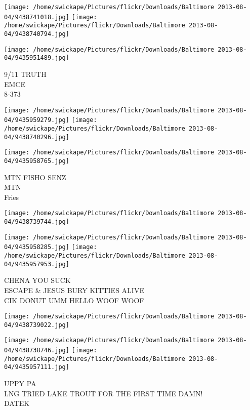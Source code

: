 \documentclass[10pt,letterpaper]{article}
\begin{document}
\texttt{[image: /home/swickape/Pictures/flickr/Downloads/Baltimore 2013-08-04/9438741018.jpg]}
\texttt{[image: /home/swickape/Pictures/flickr/Downloads/Baltimore 2013-08-04/9438740794.jpg]}

\vspace{0.25in}
\texttt{[image: /home/swickape/Pictures/flickr/Downloads/Baltimore 2013-08-04/9435951489.jpg]}

9/11 TRUTH\\
EMCE\\
8{-}373\\
\pagebreak

\texttt{[image: /home/swickape/Pictures/flickr/Downloads/Baltimore 2013-08-04/9435959279.jpg]}
\texttt{[image: /home/swickape/Pictures/flickr/Downloads/Baltimore 2013-08-04/9438740296.jpg]}

\vspace{0.25in}
\texttt{[image: /home/swickape/Pictures/flickr/Downloads/Baltimore 2013-08-04/9435958765.jpg]}

MTN FISHO SENZ\\
MTN\\
Fries\\
\pagebreak

\texttt{[image: /home/swickape/Pictures/flickr/Downloads/Baltimore 2013-08-04/9438739744.jpg]}

\vspace{0.25in}
\texttt{[image: /home/swickape/Pictures/flickr/Downloads/Baltimore 2013-08-04/9435958285.jpg]}
\texttt{[image: /home/swickape/Pictures/flickr/Downloads/Baltimore 2013-08-04/9435957953.jpg]}

CHENA YOU SUCK\\
ESCAPE \& JESUS BURY KITTIES ALIVE\\
CIK DONUT UMM HELLO WOOF WOOF\\
\pagebreak

\texttt{[image: /home/swickape/Pictures/flickr/Downloads/Baltimore 2013-08-04/9438739022.jpg]}

\vspace{0.25in}
\texttt{[image: /home/swickape/Pictures/flickr/Downloads/Baltimore 2013-08-04/9438738746.jpg]}
\texttt{[image: /home/swickape/Pictures/flickr/Downloads/Baltimore 2013-08-04/9435957111.jpg]}

UPPY PA\\
LNG TRIED LAKE TROUT FOR THE FIRST TIME DAMN!\\
DATEK\\
\pagebreak
\end{document}
